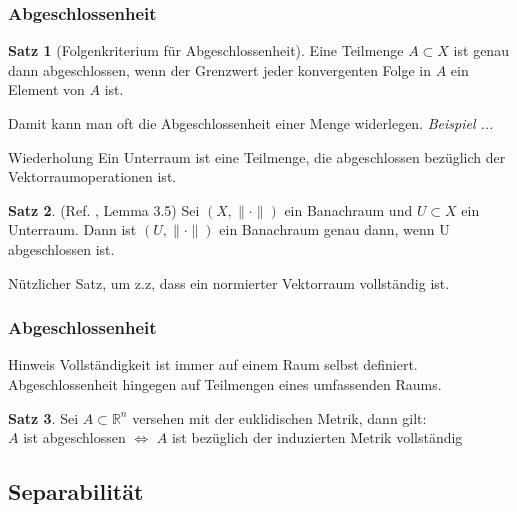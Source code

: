 \documentclass[t, handout]{beamer}
\newcommand{\R}{\mathbb{R}}
\theoremstyle{definition} %
\newtheorem{sa}{Satz}[section] %
\begin{document}
\begin{frame}
\frametitle{Abgeschlossenheit}
\begin{sa}[Folgenkriterium für Abgeschlossenheit]
Eine Teilmenge $A \subset X$ ist genau dann abgeschlossen, wenn der Grenzwert jeder konvergenten Folge in $A$ ein Element von $A$ ist.
\end{sa}
\pause
Damit kann man oft die Abgeschlossenheit einer Menge widerlegen.
\pause
\textit{Beispiel ...}
\pause
\begin{block}{Wiederholung}
Ein Unterraum ist eine Teilmenge, die abgeschlossen bezüglich der Vektorraumoperationen ist.
\end{block}
\pause
\begin{sa}
\label{abgeschlossenerUnterraum}
(Ref. \cite{Clason}, Lemma 3.5) Sei $(X , {\|\cdot\|})$ ein Banachraum und $U \subset X$ ein Unterraum. Dann ist $(U , {\|\cdot\|})$ ein Banachraum genau dann, wenn U abgeschlossen ist.
\end{sa}
\pause
Nützlicher Satz, um z.z, dass ein normierter Vektorraum vollständig ist.
\end{frame}

\begin{frame}
\frametitle{Abgeschlossenheit}
\begin{block}{Hinweis}
Vollständigkeit ist immer auf einem Raum selbst definiert.\\
Abgeschlossenheit hingegen auf Teilmengen eines umfassenden Raums.
\end{block}
\pause
\begin{sa}
Sei $A \subset \R^n$ versehen mit der euklidischen Metrik, dann gilt:\\
$A$ ist abgeschlossen $\Leftrightarrow$ $A$ ist bezüglich der induzierten Metrik vollständig
\end{sa}
\end{frame}


\subsection{Separabilität}
\end{document}

